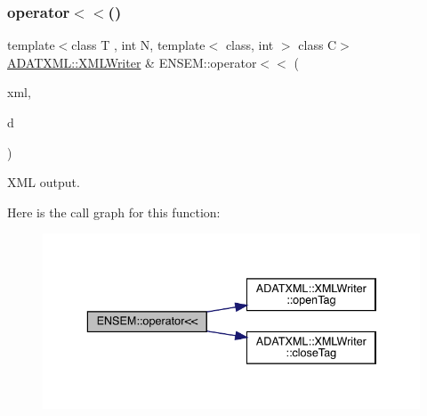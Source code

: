 \mbox{\label{group__primvector_ga5f643f72b00ff82d7abfb2a42401c045}} 
\subsubsection{\texorpdfstring{operator$<$$<$()}{operator<<()}\hspace{0.1cm}{\footnotesize\ttfamily [3/3]}}
{\footnotesize\ttfamily template$<$class T , int N, template$<$ class, int $>$ class C$>$ \\
\mbox{\hyperlink{classADATXML_1_1XMLWriter}{A\+D\+A\+T\+X\+M\+L\+::\+X\+M\+L\+Writer}} \& E\+N\+S\+E\+M\+::operator$<$$<$ (\begin{DoxyParamCaption}\item[{\mbox{\hyperlink{classADATXML_1_1XMLWriter}{A\+D\+A\+T\+X\+M\+L\+::\+X\+M\+L\+Writer}} \&}]{xml,  }\item[{const \mbox{\hyperlink{classENSEM_1_1PVector}{P\+Vector}}$<$ T, \mbox{\hyperlink{operator__name__util_8cc_a7722c8ecbb62d99aee7ce68b1752f337}{N}}, C $>$ \&}]{d }\end{DoxyParamCaption})\hspace{0.3cm}{\ttfamily [inline]}}



X\+ML output. 

Here is the call graph for this function\+:\nopagebreak
\begin{figure}[H]
\begin{center}
\leavevmode
\includegraphics[width=336pt]{d3/dc4/group__primvector_ga5f643f72b00ff82d7abfb2a42401c045_cgraph}
\end{center}
\end{figure}
\mbox{\label{group__primvector_ga4bea3f831d6562a5cb0379de835c6843}} 
